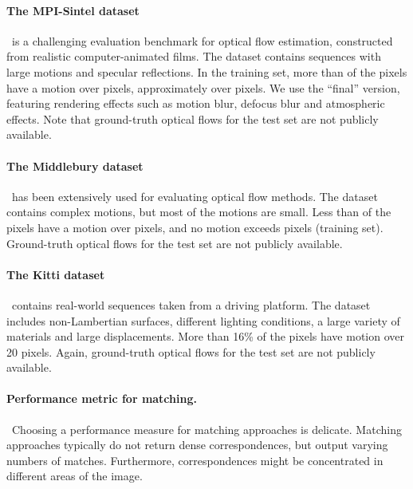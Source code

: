\documentclass[twocolumn,natbib]{svjour3}
\begin{document}
\paragraph{The MPI-Sintel dataset \citep{sintel} }\ 
 is a challenging evaluation benchmark for optical flow estimation, 
 constructed from
realistic computer-animated films. The dataset contains sequences with
large motions and specular reflections. In the training set, more
than  of the pixels have a motion over  pixels, approximately
 over  pixels. We use the ``final'' version, featuring
rendering effects such as motion blur, defocus blur and atmospheric
effects. Note that ground-truth optical flows for the test set are
not publicly available.  


\paragraph{The Middlebury dataset \citep{middlebury}}\ 
has been extensively used for evaluating optical flow methods.
The dataset contains complex motions, but most of the motions are small. Less
than  of the pixels have a motion over  pixels, and
no motion exceeds  pixels (training set). Ground-truth optical flows for the test set are
not publicly available. 


\paragraph{The Kitti dataset \cite{kitti} }\ 
contains real-world sequences taken from a driving platform.
The dataset includes non-Lambertian surfaces, different lighting conditions,
a large variety of materials and large displacements. More than 16\%
of the pixels have motion over 20 pixels. Again, ground-truth optical flows for the test set 
are not publicly available.


\paragraph{Performance metric for matching.}\ 
Choosing a performance measure for matching approaches
is delicate. Matching approaches typically do not return dense
correspondences, but output varying numbers of matches.
Furthermore, correspondences might be concentrated
in different areas of the image. 
\end{document}
